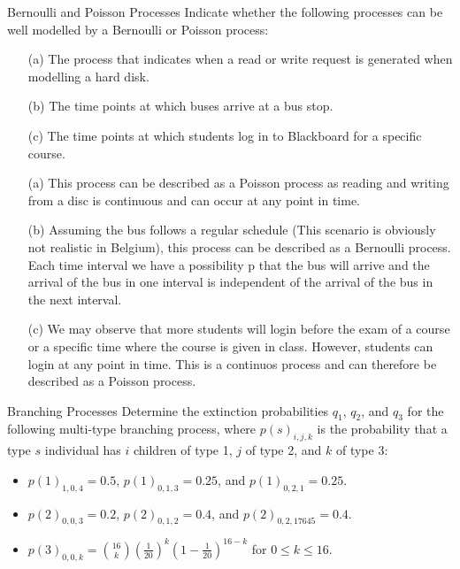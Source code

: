\begin{problem}{Bernoulli and Poisson Processes}
Indicate whether the following processes can be well modelled by a Bernoulli or Poisson process:
\begin{itemize}
    \item[(a)] The process that indicates when a read or write request is generated when modelling a hard disk.
    \item[(b)] The time points at which buses arrive at a bus stop.
    \item[(c)] The time points at which students log in to Blackboard for a specific course.
\end{itemize}
\end{problem}

\begin{solution}
\begin{itemize}
\item[(a)] This process can be described as a Poisson process as reading and writing from a disc is continuous and can occur at any point in time.
\item[(b)] Assuming the bus follows a regular schedule (This scenario is obviously not realistic in Belgium), this process can be described as a Bernoulli process. Each time interval we have a possibility p that the bus will arrive and the arrival of the bus in one interval is independent of the arrival of the bus in the next interval.
\item[(c)] We may observe that more students will login before the exam of a course or a specific time where the course is given in class. However, students can login at any point in time. This is a continuos process and can therefore be described as a Poisson process.
\end{itemize}
\end{solution}

\begin{problem}{Branching Processes}
Determine the extinction probabilities $q_1$, $q_2$, and $q_3$ for the following multi-type branching process, where $p(s)_{i,j,k}$ is the probability that a type $s$ individual has $i$ children of type 1, $j$ of type 2, and $k$ of type 3:
\begin{itemize}
    \item $p(1)_{1,0,4} = 0.5$, $p(1)_{0,1,3} = 0.25$, and $p(1)_{0,2,1} = 0.25$.
    \item $p(2)_{0,0,3} = 0.2$, $p(2)_{0,1,2} = 0.4$, and $p(2)_{0,2,17645} = 0.4$.
    \item $p(3)_{0,0,k} = \binom{16}{k} \left(\frac{1}{20}\right)^{k} \left(1 - \frac{1}{20}\right)^{16-k}$ for $0 \leq k \leq 16$.
\end{itemize}
\end{problem}

